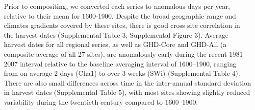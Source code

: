 \documentclass[final]{nature}
\begin{document}
\begin{methods}
\indent Prior to compositing, we converted each series to anomalous days per year, relative to their mean for 1600-1900. Despite the broad geographic range and climates gradients covered by these sites, there is good cross site correlation in the harvest dates (Supplemental Table 3; Supplemental Figure 3).  Average harvest dates for all regional series, as well as GHD-Core and GHD-All (a composite average of all 27 sites), are anomalously early during the recent 1981--2007 interval relative to the baseline averaging interval of 1600--1900, ranging from on average 2 days (Cha1) to over 3 weeks (SWi) (Supplemental Table 4). There are also small differences across time in the inter-annual standard deviation in harvest dates (Supplemental Table 5), with most sites showing slightly reduced variability during the twentieth century compared to 1600--1900.


\end{methods}
\end{document}
